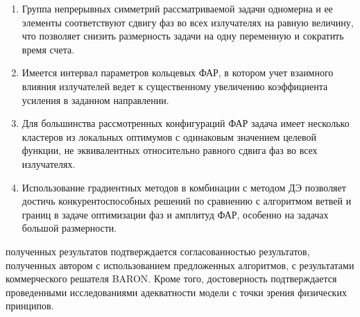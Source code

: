 {}
\begin{enumerate}[beginpenalty=10000] %
  \item Группа непрерывных симметрий рассматриваемой задачи одномерна и ее элементы соответствуют сдвигу фаз во всех излучателях на равную величину, что позволяет снизить размерность задачи на одну переменную и сократить время счета.
  \item Имеется интервал параметров кольцевых ФАР, в котором учет взаимного влияния излучателей ведет к существенному увеличению коэффициента усиления в заданном направлении.
  \item Для большинства рассмотренных конфигураций ФАР задача имеет несколько кластеров из локальных оптимумов с одинаковым значением целевой функции, не эквивалентных относительно равного сдвига фаз во всех излучателях.
  \item Использование градиентных методов в комбинации с методом ДЭ позволяет достичь конкурентоспособных решений по сравнению с алгоритмом ветвей и границ в задаче оптимизации фаз и амплитуд ФАР, особенно на задачах большой размерности.
\end{enumerate}

{\reliability} полученных результатов подтверждается согласованностью  результатов, полученных автором с использованием предложенных алгоритмов, с результатами коммерческого решателя BARON. Кроме того, достоверность подтверждается проведенными исследованиями адекватности модели с точки зрения физических принципов.


